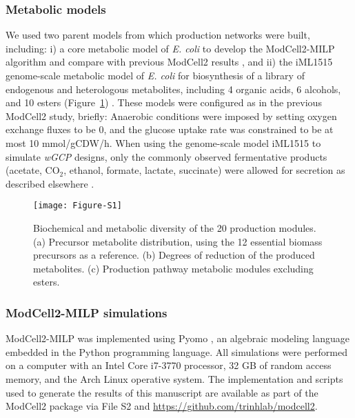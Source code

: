 \subsubsection{Metabolic models}
We used two parent models from which production networks were built, including: i) a core metabolic model of \textit{E. coli} \citep{trinh2015} to develop the ModCell2-MILP algorithm and compare with previous ModCell2 results \citep{garcia2019}, and ii) the iML1515 genome-scale metabolic model of \textit{E. coli}\citep{monk2017} for biosynthesis of a library of endogenous and heterologous metabolites, including 4 organic acids, 6 alcohols, and 10 esters (Figure~\ref{fig5:fig-s1}) \citep{akita2016, atsumi2008, layton2014, niu2014, rodriguez2014, shen2011, trinh2008, tseng2012, yim2011, yu2014}.
These models were configured as in the previous ModCell2 study\citep{garcia2019}, briefly: Anaerobic conditions were imposed by setting oxygen exchange fluxes to be 0, and the glucose uptake rate was constrained to be at most 10 mmol/gCDW/h. When using the genome-scale model iML1515 to simulate \emph{wGCP} designs, only the commonly observed fermentative products (acetate, CO$_2$, ethanol, formate, lactate, succinate) were allowed for secretion as described elsewhere \citep{kamp2017}.
\begin{figure}[h]
    \centering
    \texttt{[image: Figure-S1]}
    \caption[Biochemical and metabolic diversity of the 20 production modules]{
Biochemical and metabolic diversity of the 20 production modules. (a) Precursor metabolite distribution, using the 12 essential biomass precursors as a reference. (b) Degrees of reduction of the produced metabolites. (c) Production pathway metabolic modules excluding esters.
    }
    \label{fig5:fig-s1}
\end{figure}

\subsubsection{ModCell2-MILP simulations}
ModCell2-MILP was implemented using Pyomo \citep{hart2017}, an algebraic modeling language embedded in the Python programming language. All simulations were performed on a computer with an Intel Core i7-3770 processor, 32 GB of random access memory, and the Arch Linux operative system. The implementation and scripts used to generate the results of this manuscript are available as part of the ModCell2 package via File S2  and \url{https://github.com/trinhlab/modcell2}.
